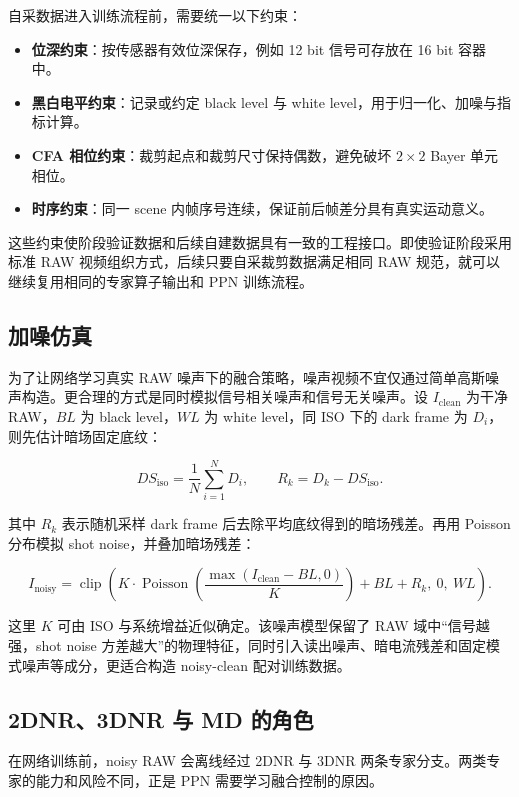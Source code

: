 \documentclass[UTF8,zihao=-4]{ctexart}
\begin{document}
自采数据进入训练流程前，需要统一以下约束：

\begin{itemize}
  \item \textbf{位深约束}：按传感器有效位深保存，例如 12 bit 信号可存放在 16 bit 容器中。
  \item \textbf{黑白电平约束}：记录或约定 black level 与 white level，用于归一化、加噪与指标计算。
  \item \textbf{CFA 相位约束}：裁剪起点和裁剪尺寸保持偶数，避免破坏 $2\times2$ Bayer 单元相位。
  \item \textbf{时序约束}：同一 scene 内帧序号连续，保证前后帧差分具有真实运动意义。
\end{itemize}

这些约束使阶段验证数据和后续自建数据具有一致的工程接口。即使验证阶段采用标准 RAW 视频组织方式，后续只要自采裁剪数据满足相同 RAW 规范，就可以继续复用相同的专家算子输出和 PPN 训练流程。

\subsection{加噪仿真}

为了让网络学习真实 RAW 噪声下的融合策略，噪声视频不宜仅通过简单高斯噪声构造。更合理的方式是同时模拟信号相关噪声和信号无关噪声。设 $I_{\mathrm{clean}}$ 为干净 RAW，$BL$ 为 black level，$WL$ 为 white level，同 ISO 下的 dark frame 为 $D_i$，则先估计暗场固定底纹：

\[
DS_{\mathrm{iso}}=\frac{1}{N}\sum_{i=1}^{N}D_i,
\qquad
R_k=D_k-DS_{\mathrm{iso}}.
\]

其中 $R_k$ 表示随机采样 dark frame 后去除平均底纹得到的暗场残差。再用 Poisson 分布模拟 shot noise，并叠加暗场残差：

\[
I_{\mathrm{noisy}}=
\operatorname{clip}\left(
K\cdot\operatorname{Poisson}\left(
\frac{\max(I_{\mathrm{clean}}-BL,0)}{K}
\right)+BL+R_k,\ 0,\ WL
\right).
\]

这里 $K$ 可由 ISO 与系统增益近似确定。该噪声模型保留了 RAW 域中“信号越强，shot noise 方差越大”的物理特征，同时引入读出噪声、暗电流残差和固定模式噪声等成分，更适合构造 noisy-clean 配对训练数据。

\subsection{2DNR、3DNR 与 MD 的角色}

在网络训练前，noisy RAW 会离线经过 2DNR 与 3DNR 两条专家分支。两类专家的能力和风险不同，正是 PPN 需要学习融合控制的原因。
\end{document}
